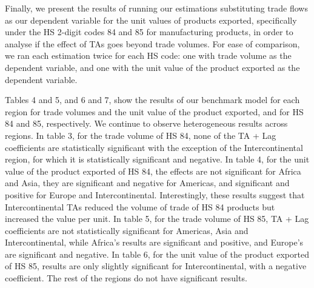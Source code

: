 Finally, we present the results of running our estimations substituting
trade flows as our dependent variable for the unit values of products
exported, specifically under the HS 2-digit codes 84 and 85 for
manufacturing products, in order to analyse if the effect of TAs goes
beyond trade volumes. For ease of comparison, we ran each estimation
twice for each HS code: one with trade volume as the dependent variable,
and one with the unit value of the product exported as the dependent
variable.

Tables 4 and 5, and 6 and 7, show the results of our benchmark model for
each region for trade volumes and the unit value of the product
exported, and for HS 84 and 85, respectively. We continue to observe
heterogeneous results across regions. In table 3, for the trade volume
of HS 84, none of the TA + Lag coefficients are statistically
significant with the exception of the Intercontinental region, for which
it is statistically significant and negative. In table 4, for the unit
value of the product exported of HS 84, the effects are not significant
for Africa and Asia, they are significant and negative for Americas, and
significant and positive for Europe and Intercontinental. Interestingly,
these results suggest that Intercontinental TAs reduced the volume of
trade of HS 84 products but increased the value per unit. In table 5,
for the trade volume of HS 85, TA + Lag coefficients are not
statistically significant for Americas, Asia and Intercontinental, while
Africa's results are significant and positive, and Europe's are
significant and negative. In table 6, for the unit value of the product
exported of HS 85, results are only slightly significant for
Intercontinental, with a negative coefficient. The rest of the regions
do not have significant results.


